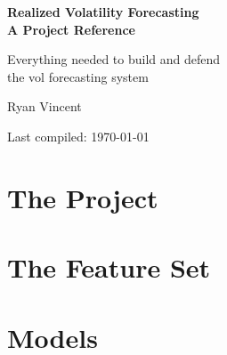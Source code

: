 \documentclass[11pt,a4paper]{report}
\begin{document}
\begin{titlepage}
\centering
\vspace*{3cm}
{\Huge\bfseries Realized Volatility Forecasting\\[0.4cm]
A Project Reference\par}
\vspace{1.5cm}
{\Large Everything needed to build and defend\\[0.3cm]
the vol forecasting system\par}
\vspace{1cm}
{\Large Ryan Vincent\par}
\vfill
{\small Last compiled: \today\par}
\end{titlepage}

\tableofcontents
\newpage


\part{The Project}





\part{The Feature Set}









\part{Models}





\end{document}
